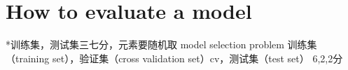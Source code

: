 \documentclass[10pt]{article}
\begin{document}

\section{How to evaluate a model}
*训练集，测试集三七分，元素要随机取
model selection problem
训练集（training set），验证集（cross validation set）cv，测试集（test set）
6,2,2分




\end{document}
